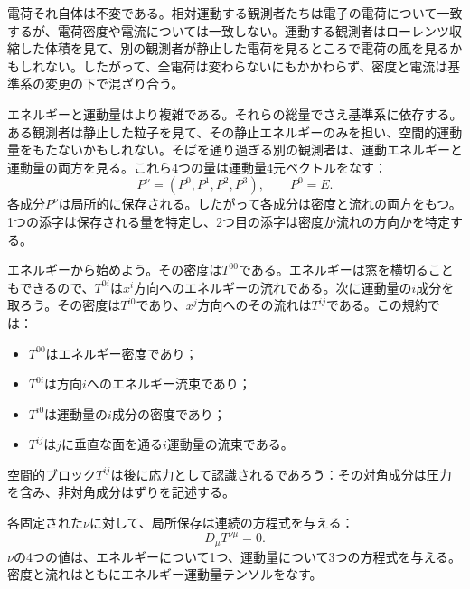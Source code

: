 電荷それ自体は不変である。相対運動する観測者たちは電子の電荷について一致するが、電荷密度や電流については一致しない。運動する観測者はローレンツ収縮した体積を見て、別の観測者が静止した電荷を見るところで電荷の風を見るかもしれない。したがって、全電荷は変わらないにもかかわらず、密度と電流は基準系の変更の下で混ざり合う。

エネルギーと運動量はより複雑である。それらの総量でさえ基準系に依存する。ある観測者は静止した粒子を見て、その静止エネルギーのみを担い、空間的運動量をもたないかもしれない。そばを通り過ぎる別の観測者は、運動エネルギーと運動量の両方を見る。これら4つの量は運動量4元ベクトルをなす：
\begin{equation}
 P^\nu=(P^0,P^1,P^2,P^3),
 \qquad P^0=E.
\end{equation}
各成分\(P^\nu\)は局所的に保存される。したがって各成分は密度と流れの両方をもつ。1つの添字は保存される量を特定し、2つ目の添字は密度か流れの方向かを特定する。

エネルギーから始めよう。その密度は\(T^{00}\)である。エネルギーは窓を横切ることもできるので、\(T^{0i}\)は\(x^i\)方向へのエネルギーの流れである。次に運動量の\(i\)成分を取ろう。その密度は\(T^{i0}\)であり、\(x^j\)方向へのその流れは\(T^{ij}\)である。この規約では：
\begin{itemize}
 \item \(T^{00}\)はエネルギー密度であり；
 \item \(T^{0i}\)は方向\(i\)へのエネルギー流束であり；
 \item \(T^{i0}\)は運動量の\(i\)成分の密度であり；
 \item \(T^{ij}\)は\(j\)に垂直な面を通る\(i\)運動量の流束である。
\end{itemize}
空間的ブロック\(T^{ij}\)は後に応力として認識されるであろう：その対角成分は圧力を含み、非対角成分はずりを記述する。

\begin{classroomqa}
\end{classroomqa}

各固定された\(\nu\)に対して、局所保存は連続の方程式を与える：
\begin{equation}
 D_\mu T^{\nu\mu}=0.
 \label{eq:stress-continuity}
\end{equation}
\(\nu\)の4つの値は、エネルギーについて1つ、運動量について3つの方程式を与える。密度と流れはともにエネルギー運動量テンソルをなす。

